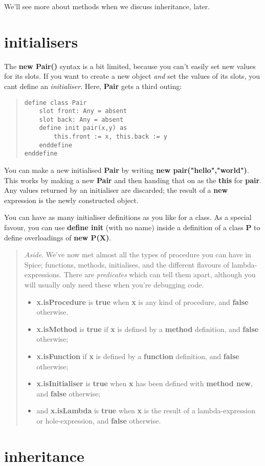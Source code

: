 \documentclass{report}
\begin{document}
We'll see more about methods when we discuss inheritance, later.\section{initialisers}


The {\bf new Pair()} syntax is a bit limited, because you can't easily set new
values for its slots. If you want to create a new object {\em and} set the
values of its slots, you cant define an {\em initialiser}. Here, {\bf Pair} gets a
third outing:

\begin{quote}
\begin{verbatim}
define class Pair
    slot front: Any = absent
    slot back: Any = absent
    define init pair(x,y) as
        this.front := x, this.back := y
    enddefine
enddefine
\end{verbatim}
\end{quote}
You can make a new initialised {\bf Pair} by writing {\bf new pair("hello","world")}.
This works by making a new {\bf Pair} and then handing that on as the {\bf this} for
{\bf pair}. Any values returned by an initialiser are discarded; the result of a
{\bf new} expression is the newly constructed object.

You can have as many initialiser definitions as you like for a class. As a
special favour, you can use {\bf define init} (with no name) inside a definition
of a class {\bf P} to define overloadings of {\bf new P(X)}.

\begin{quote}{\em Aside}. We've now met almost all the types of procedure you can have in
Spice; functions, methods, initialises, and the different flavours of
lambda-expressions. There are {\em predicates} which can tell them apart, although
you will usually only need these when you're debugging code.\begin{itemize}\item {\bf x.isProcedure} is {\bf true} when {\bf x} is any kind of procedure, and {\bf false}
otherwise.

\item {\bf x.isMethod} is {\bf true} if {\bf x} is defined by a {\bf method} definition, and {\bf false}
otherwise;

\item {\bf x.isFunction} if {\bf x} is defined by a {\bf function} definition, and {\bf false}
otherwise;

\item {\bf x.isInitialiser} is {\bf true} when {\bf x} has been defined with {\bf method new}, and
{\bf false} otherwise;

\item and {\bf x.isLambda} is {\bf true} when {\bf x} is the result of a lambda-expression or
hole-expression, and {\bf false} otherwise.

\end{itemize}\end{quote}\section{inheritance}
\end{document}
